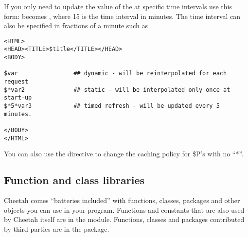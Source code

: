 If you only need to update the value of the  at specific time intervals use
this form:  becomes  , where 15 is the time interval in
minutes.  The time interval can also be specified in fractions of a minute such
as .

\begin{verbatim}
<HTML>
<HEAD><TITLE>$title</TITLE></HEAD>
<BODY>

$var                ## dynamic - will be reinterpolated for each request
$*var2              ## static - will be interpolated only once at start-up
$*5*var3            ## timed refresh - will be updated every 5 minutes.

</BODY>
</HTML>
\end{verbatim}

You can also use the  directive to change the
caching policy for \$P's with no ``*''.


\subsection{Function and class libraries}

Cheetah comes ``batteries included'' with functions, classes, packages and
other objects you can use in your program.  Functions and constants that are
also used by Cheetah itself are in the  module.
Functions, classes and packages contributed by third parties are in the
 package.  

